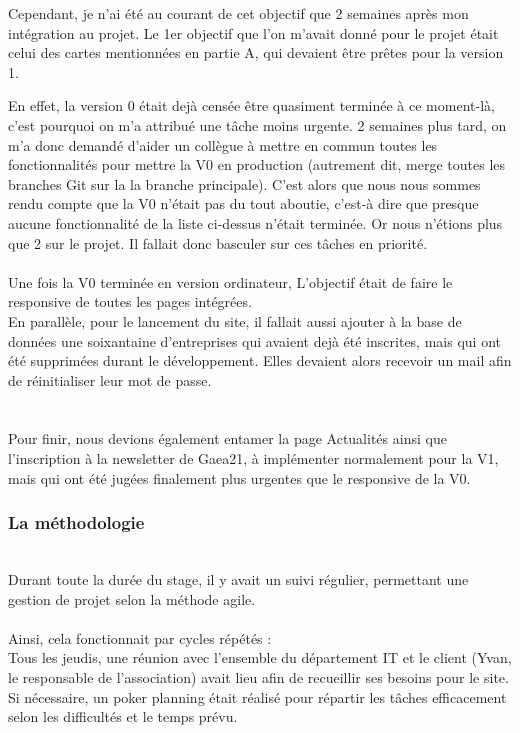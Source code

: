 Cependant, je n'ai été au courant de cet objectif que 2 semaines après mon intégration au projet. 
Le 1er objectif que l'on m'avait donné pour le projet était celui des cartes mentionnées en partie A, qui devaient être prêtes pour la version 1. 

En effet, la version 0 était dejà censée être quasiment terminée à ce moment-là, c'est pourquoi on m'a attribué une tâche moins urgente. 
2 semaines plus tard, on m'a donc demandé d'aider un collègue à mettre en commun toutes les fonctionnalités pour mettre la V0 en production 
(autrement dit, merge toutes les branches Git sur la la branche principale).
C'est alors que nous nous sommes rendu compte que la V0 n'était pas du tout aboutie, c'est-à dire que presque aucune fonctionnalité de la liste ci-dessus n'était terminée. 
Or nous n'étions plus que 2 sur le projet. Il fallait donc basculer sur ces tâches en priorité.
\\\\
Une fois la V0 terminée en version ordinateur, L'objectif était de faire le responsive de toutes les pages intégrées. 
\\
En parallèle, pour le lancement du site, il fallait aussi ajouter à la base de données une soixantaine d'entreprises qui avaient dejà été inscrites, mais qui ont été supprimées durant le développement.
Elles devaient alors recevoir un mail afin de réinitialiser leur mot de passe.\\
\\\\
Pour finir, nous devions également entamer la page Actualités ainsi que l'inscription à la newsletter de Gaea21, à implémenter normalement pour la V1, mais qui ont été jugées finalement plus urgentes que le responsive de la V0.


\subsubsection{La méthodologie}
~\\
Durant toute la durée du stage, il y avait un suivi régulier, permettant une gestion de projet selon la méthode agile.
\\\\
Ainsi, cela fonctionnait par cycles répétés :\\ 

Tous les jeudis, une réunion avec l'ensemble du département IT et le client (Yvan, le responsable de l'association) avait lieu afin de recueillir ses besoins pour le site.\\
Si nécessaire, un poker planning était réalisé pour répartir les tâches efficacement selon les difficultés et le temps prévu.\\

